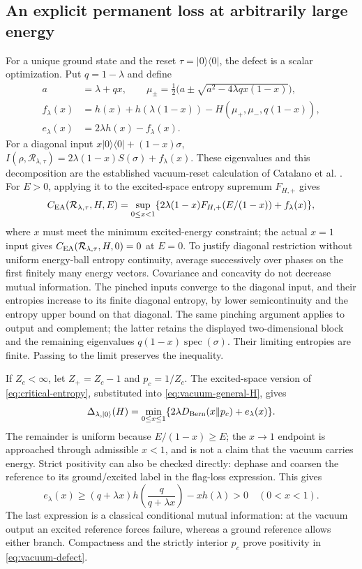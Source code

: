 \documentclass[11pt]{article}
\newcommand{\Rcal}{\mathcal R_{\lambda,\tau}}
\begin{document}
\subsection{An explicit permanent loss at arbitrarily large energy}
For a unique ground state and the reset $\tau=|0\rangle\langle0|$,
the defect is a scalar optimization. Put $q=1-\lambda$ and define
\begin{align}
 a&=\lambda+qx,\qquad
 \mu_\pm=\tfrac12\bigl(a\pm\sqrt{a^2-4\lambda qx(1-x)}\bigr),\nonumber\\
 f_\lambda(x)&=h(x)+h(\lambda(1-x))
       -H(\mu_+,\mu_-,q(1-x)),\label{eq:vacuum-scalar}\\
 e_\lambda(x)&=2\lambda h(x)-f_\lambda(x).\nonumber
\end{align}
For a diagonal input $x|0\rangle\langle0|+(1-x)\sigma$,
$I(\rho,\Rcal)=2\lambda(1-x)S(\sigma)+f_\lambda(x)$.
These eigenvalues and this decomposition are the established
vacuum-reset calculation of Catalano et al.
\cite[Section VI.B and Appendix C, equations (C1)--(C11)]{catalano}.
For $E>0$, applying it to the excited-space entropy supremum $F_{H,+}$ gives
\begin{equation}\label{eq:vacuum-general-H}
 C_{\rm EA}(\Rcal,H,E)=
 \sup_{0\le x<1}
 \{2\lambda(1-x)F_{H,+}(E/(1-x))+f_\lambda(x)\},
\end{equation}
where $x$ must meet the minimum excited-energy constraint; the
actual $x=1$ input gives $C_{\rm EA}(\Rcal,H,0)=0$ at $E=0$.
To justify diagonal restriction without uniform energy-ball entropy
continuity, average successively over phases on the first finitely
many energy vectors. Covariance and concavity do not decrease mutual
information. The pinched inputs converge to the diagonal input,
and their entropies increase to its finite diagonal entropy, by
lower semicontinuity and the entropy upper bound on that diagonal.
The same pinching argument applies to output and complement; the
latter retains the displayed two-dimensional block and the remaining
eigenvalues $q(1-x)\operatorname{spec}(\sigma)$. Their limiting
entropies are finite. Passing to the limit preserves the inequality.

If $Z_c<\infty$, let $Z_+=Z_c-1$ and $p_c=1/Z_c$.
The excited-space version of \eqref{eq:critical-entropy}, substituted
into \eqref{eq:vacuum-general-H}, gives
\begin{equation}\label{eq:vacuum-defect}
 \Delta_{\lambda,|0\rangle}(H)=
 \min_{0\le x\le1}
       \{2\lambda D_{\rm Bern}(x\Vert p_c)+e_\lambda(x)\}.
\end{equation}
The remainder is uniform because $E/(1-x)\ge E$; the $x\to1$
endpoint is approached through admissible $x<1$, and is not a
claim that the vacuum carries energy. Strict positivity can also
be checked directly: dephase and coarsen the reference to its
ground/excited label in the flag-loss expression. This gives
\[
 e_\lambda(x)\ge
 (q+\lambda x)h\!\left(\frac q{q+\lambda x}\right)-xh(\lambda)>0
 \quad(0<x<1).
\]
The last expression is a classical conditional mutual information:
at the vacuum output an excited reference forces failure, whereas
a ground reference allows either branch. Compactness and the
strictly interior $p_c$ prove positivity in \eqref{eq:vacuum-defect}.
\end{document}

